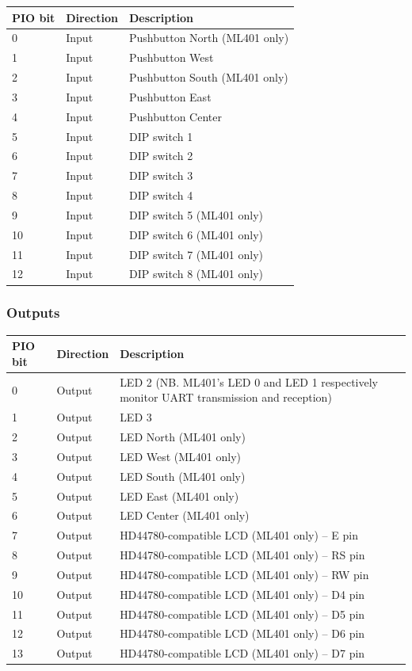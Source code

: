 \documentclass[a4paper,11pt]{article}
\begin{document}
\begin{tabularx}{\textwidth}{|l|l|X|}
\hline
\bf{PIO bit} & \bf{Direction} & \bf{Description} \\
\hline
0 & Input & Pushbutton North (ML401 only) \\
\hline
1 & Input & Pushbutton West \\
\hline
2 & Input & Pushbutton South (ML401 only) \\
\hline
3 & Input & Pushbutton East \\
\hline
4 & Input & Pushbutton Center \\
\hline
5 & Input & DIP switch 1 \\
\hline
6 & Input & DIP switch 2 \\
\hline
7 & Input & DIP switch 3 \\
\hline
8 & Input & DIP switch 4 \\
\hline
9 & Input & DIP switch 5 (ML401 only) \\
\hline
10 & Input & DIP switch 6 (ML401 only) \\
\hline
11 & Input & DIP switch 7 (ML401 only) \\
\hline
12 & Input & DIP switch 8 (ML401 only) \\
\hline
\end{tabularx}

\subsubsection{Outputs}

\begin{tabularx}{\textwidth}{|l|l|X|}
\hline
\bf{PIO bit} & \bf{Direction} & \bf{Description} \\
\hline
0 & Output & LED 2 (NB. ML401's LED 0 and LED 1 respectively monitor UART transmission and reception) \\
\hline
1 & Output & LED 3 \\
\hline
2 & Output & LED North (ML401 only) \\
\hline
3 & Output & LED West (ML401 only) \\
\hline
4 & Output & LED South (ML401 only) \\
\hline
5 & Output & LED East (ML401 only) \\
\hline
6 & Output & LED Center (ML401 only) \\
\hline
7 & Output & HD44780-compatible LCD (ML401 only) -- E pin \\
\hline
8 & Output & HD44780-compatible LCD (ML401 only) -- RS pin \\
\hline
9 & Output & HD44780-compatible LCD (ML401 only) -- RW pin \\
\hline
10 & Output & HD44780-compatible LCD (ML401 only) -- D4 pin \\
\hline
11 & Output & HD44780-compatible LCD (ML401 only) -- D5 pin \\
\hline
12 & Output & HD44780-compatible LCD (ML401 only) -- D6 pin \\
\hline
13 & Output & HD44780-compatible LCD (ML401 only) -- D7 pin \\
\hline
\end{tabularx}
\end{document}
